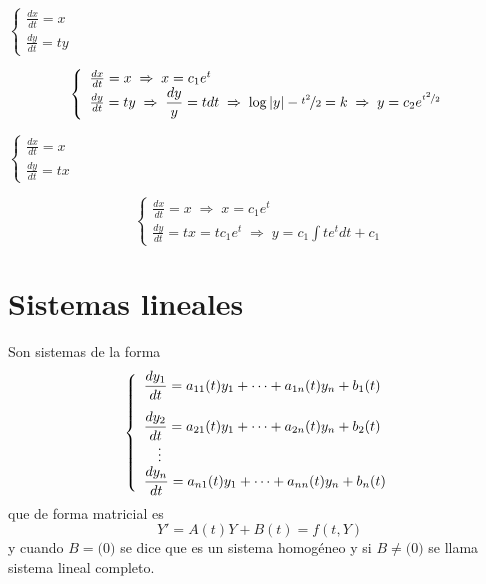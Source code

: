 \begin{ejer}[\textbf{34}]
     $\left\{ \begin{array}{l}
        \frac{dx}{dt}=x \\
        \frac{dy}{dt}=t y 
\end{array} \right.$
\end{ejer}
\begin{sol}
     $$\left\{ \begin{array}{l}
        \frac{dx}{dt}=x \; \Rightarrow \; x=c_1 e^t\\
        \frac{dy}{dt}=t y \; \Rightarrow \; \dfrac{dy}{y}=t dt \; \Rightarrow \; \log|y|-\nicefrac{t^2}{2}=k \; \Rightarrow \; y=c_2e^{\nicefrac{t^2}{2}}
\end{array} \right.$$
\end{sol}
\begin{ejer}
 $\left\{ \begin{array}{l}
        \frac{dx}{dt}=x \\
        \frac{dy}{dt}=t x 
\end{array} \right.$
\end{ejer}
\begin{sol}
    $$\left\{ \begin{array}{l}
        \frac{dx}{dt}=x \; \Rightarrow \; x=c_1 e^t \\
        \frac{dy}{dt}=t x = tc_1e^t \; \Rightarrow \; y=c_1 \int t e^t dt + c_1
\end{array} \right.$$
\end{sol}
\section{Sistemas lineales}
Son sistemas de la forma
$$\left\{ \begin{array}{l}
        \vspace{3mm} \dfrac{dy_1}{dt}= a_{11}(t)y_1+\cdots+ a_{1n}(t)y_n + b_1(t) \\
        \dfrac{dy_2}{dt}= a_{21}(t)y_1+\cdots +a_{2n}(t)y_n + b_2(t) \\
      \quad \vdots \\
     \dfrac{dy_n}{dt}= a_{n1}(t)y_1+\cdots +a_{nn}(t)y_n + b_n(t)
\end{array} \right.$$
que de forma matricial es
$$Y'=A(t)Y + B(t)=f(t,Y)$$
y cuando $B=\Big( 0 \Big)$ se dice que es un sistema homogéneo y si $B\neq \Big( 0 \Big)$ se llama sistema lineal completo.
